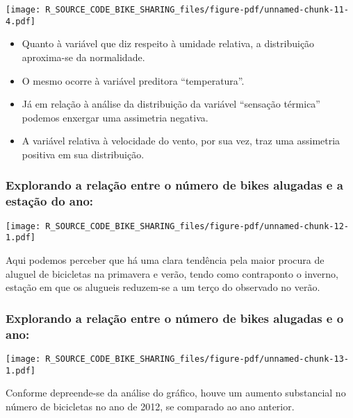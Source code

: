 \documentclass[
  letterpaper,
  DIV=11,
  numbers=noendperiod]{scrartcl}
\begin{document}
\begin{center}
\texttt{[image: R\_SOURCE\_CODE\_BIKE\_SHARING\_files/figure-pdf/unnamed-chunk-11-4.pdf]}
\end{center}

\begin{itemize}
\item
  Quanto à variável que diz respeito à umidade relativa, a distribuição
  aproxima-se da normalidade.
\item
  O mesmo ocorre à variável preditora ``temperatura''.
\item
  Já em relação à análise da distribuição da variável ``sensação
  térmica'' podemos enxergar uma assimetria negativa.
\item
  A variável relativa à velocidade do vento, por sua vez, traz uma
  assimetria positiva em sua distribuição.
\end{itemize}

\subsubsection{Explorando a relação entre o número de bikes alugadas e a
estação do
ano:}\label{explorando-a-relauxe7uxe3o-entre-o-nuxfamero-de-bikes-alugadas-e-a-estauxe7uxe3o-do-ano}

\begin{center}
\texttt{[image: R\_SOURCE\_CODE\_BIKE\_SHARING\_files/figure-pdf/unnamed-chunk-12-1.pdf]}
\end{center}

Aqui podemos perceber que há uma clara tendência pela maior procura de
aluguel de bicicletas na primavera e verão, tendo como contraponto o
inverno, estação em que os alugueis reduzem-se a um terço do observado
no verão.

\subsubsection{Explorando a relação entre o número de bikes alugadas e o
ano:}\label{explorando-a-relauxe7uxe3o-entre-o-nuxfamero-de-bikes-alugadas-e-o-ano}

\begin{center}
\texttt{[image: R\_SOURCE\_CODE\_BIKE\_SHARING\_files/figure-pdf/unnamed-chunk-13-1.pdf]}
\end{center}

Conforme depreende-se da análise do gráfico, houve um aumento
substancial no número de bicicletas no ano de 2012, se comparado ao ano
anterior.
\end{document}
